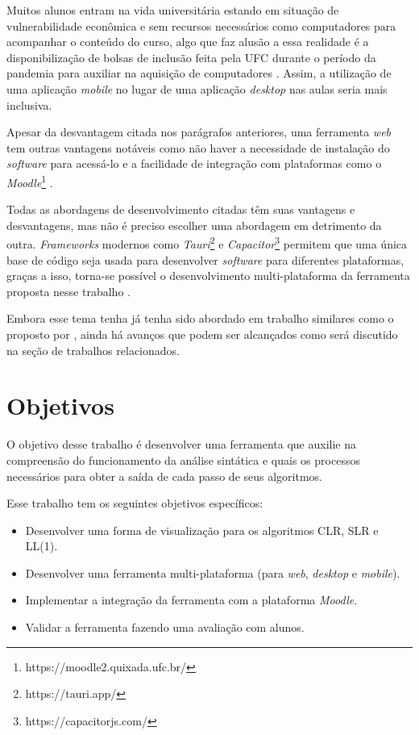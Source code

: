 Muitos alunos entram na vida universitária estando em situação de vulnerabilidade econômica e sem recursos necessários como computadores para acompanhar o conteúdo do curso, algo que faz alusão a essa realidade é a disponibilização de bolsas de inclusão feita pela UFC durante o período da pandemia para auxiliar na aquisição de computadores \cite{povo_ufc_2020}. Assim, a utilização de uma aplicação \textit{mobile} no lugar de uma aplicação \textit{desktop} nas aulas seria mais inclusiva.

Apesar da desvantagem citada nos parágrafos anteriores, uma ferramenta \textit{web} tem outras vantagens notáveis como não haver a necessidade de instalação do \textit{software} para acessá-lo e a facilidade de integração com plataformas como o \textit{Moodle}\footnote{https://moodle2.quixada.ufc.br/} \cite{desai_web_2022}.

Todas as abordagens de desenvolvimento citadas têm suas vantagens e desvantagens, mas não é preciso  escolher uma abordagem em detrimento da outra. \textit{Frameworks} modernos como \textit{Tauri}\footnote{https://tauri.app/} e \textit{Capacitor}\footnote{https://capacitorjs.com/} permitem que uma única base de código seja usada para desenvolver \textit{software} para diferentes plataformas, graças a isso, torna-se possível o desenvolvimento multi-plataforma da ferramenta proposta nesse trabalho \cite{shevtsiv2021cross}.

Embora esse tema tenha já tenha sido abordado em trabalho similares como o proposto por \textcite{pavt}, ainda há avanços que podem ser alcançados como será discutido na seção de trabalhos relacionados.

\section{Objetivos}
O objetivo desse trabalho é desenvolver uma ferramenta que auxilie na compreensão do funcionamento da análise sintática e quais os processos necessários para obter a saída de cada passo de seus algoritmos.

Esse trabalho tem os seguintes objetivos específicos:
\begin{itemize}[label=$\sbullet$]
    \item Desenvolver uma forma de visualização para os algoritmos CLR, SLR e LL(1).
    \item Desenvolver uma ferramenta multi-plataforma (para \textit{web}, \textit{desktop} e \textit{mobile}).
    \item Implementar a integração da ferramenta com a plataforma \textit{Moodle}.
    \item Validar a ferramenta fazendo uma avaliação com alunos.
\end{itemize}

